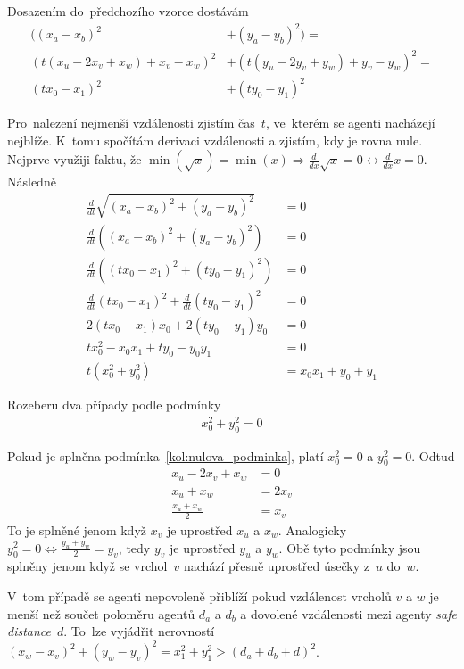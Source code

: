 Dosazením do~předchozího vzorce dostávám
\begin{align*}
  ((x_a - x_b)^2 &+ (y_a - y_b)^2) = \\
  (t(x_u - 2x_v + x_w) + x_v - x_w)^2 &+ (t(y_u - 2y_v + y_w) + y_v - y_w)^2 = \\
  (tx_0 - x_1)^2 &+ (ty_0 - y_1)^2
\end{align*}

Pro~nalezení nejmenší vzdálenosti zjistím čas~$t$, ve~kterém se agenti nacházejí nejblíže.
K~tomu spočítám derivaci vzdálenosti a zjistím, kdy je rovna nule.
Nejprve využiji faktu, že $\min\left(\sqrt{x}\right) = \min(x) \Rightarrow \frac{d}{dx} \sqrt {x} = 0 \leftrightarrow \frac{d}{dx} x=0$.
Následně
\begin{align}
  \frac{d}{dt} \sqrt{(x_a - x_b)^2 + (y_a - y_b)^2} &= 0 \nonumber \\
  \frac{d}{dt} ((x_a - x_b)^2 + (y_a - y_b)^2) &= 0 \nonumber \\
  \frac{d}{dt} ((tx_0 - x_1)^2 + (ty_0 - y_1)^2) &= 0 \nonumber \\
  \frac{d}{dt} (tx_0 - x_1)^2 + \frac{d}{dt} (ty_0 - y_1)^2 &= 0 \nonumber \\
  2(tx_0 - x_1)x_0 + 2(ty_0 - y_1)y_0 &= 0 \nonumber \\
  tx_0^2 - x_0 x_1 + ty_0 - y_0 y_1 &= 0 \nonumber \\
  t(x_0^2 + y_0^2) &= x_0 x_1 + y_0 + y_1 \label{eq:kol_d_dt}
\end{align}

Rozeberu dva případy podle podmínky
\begin{gather}
  x_0^2 + y_0^2 = 0\label{kol:nulova_podminka}
\end{gather}

Pokud je splněna podmínka~\ref{kol:nulova_podminka}, platí $x_0^2 = 0$ a $y_0^2 = 0$.
Odtud
\begin{align*}
  x_u - 2 x_v + x_w &= 0 \\
  x_u + x_w &= 2 x_v \\
  \frac{x_u + x_w}{2} &= x_v
\end{align*}
To je splněné jenom když $x_v$ je uprostřed $x_u$ a $x_w$.
Analogicky $y_0^2 = 0 \Leftrightarrow \frac{y_u + y_w}{2} = y_v$, tedy $y_v$ je uprostřed $y_u$ a $y_w$.
Obě tyto podmínky jsou splněny jenom když se vrchol~$v$ nachází přesně uprostřed úsečky z~$u$ do~$w$.

V~tom případě se agenti nepovoleně přiblíží pokud vzdálenost vrcholů $v$ a $w$ je menší než
součet poloměru agentů $d_a$ a $d_b$ a dovolené vzdálenosti mezi agenty \emph{safe distance}~$d$.
To~lze vyjádřit nerovností $(x_w - x_v)^2 + (y_w - y_v)^2 = x_1^2 + y_1^2 > (d_a + d_b + d)^2$.


